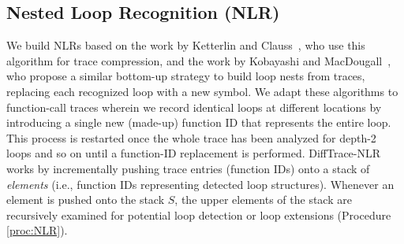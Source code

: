 \subsection{Nested Loop Recognition (NLR)}
\label{subsec:algo-nlr}

We build NLRs based on the work by Ketterlin and Clauss~\cite{Ketterlin-nlr},
who use this algorithm for trace compression,
and the work by Kobayashi and MacDougall~\cite{kobayashi-84}, who propose
a similar bottom-up strategy to build loop nests from traces,
replacing each recognized loop with a new symbol.
%
%
%
%
We adapt these algorithms
to function-call traces
wherein we record
identical loops at different locations by introducing
a single new (made-up) function ID that represents the entire loop.
%
This process is restarted once the whole trace has been analyzed for depth-2 loops and so on until a function-ID replacement is performed.
%
DiffTrace-NLR works by incrementally pushing trace entries (function IDs)
onto a stack of \textit{elements} (i.e., function IDs
representing detected loop structures).
%
Whenever an element is pushed onto the stack $S$,
the upper elements of the stack are recursively
examined for potential loop detection or loop extensions (Procedure \ref{proc:NLR}).



%

